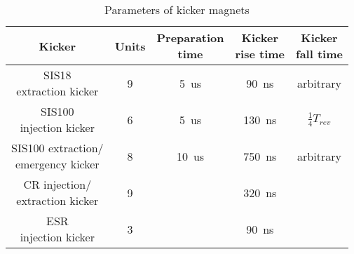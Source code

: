 
\label{kicker_time}

\begin{table}[!htb]

\caption{Parameters of kicker magnets}
\label{requirement}
\begin{center}
    \begin{tabular}{ | c | c | c | c| c |}
    \hline
\rowcolor[gray]{0.5}
Kicker 									&Units & \tabincell{c}{ Preparation\\time} & \tabincell{c}{Kicker \\rise time} & \tabincell{c}{ Kicker \\fall time} \\ \hline
\tabincell{c}{ SIS18 \\extraction kicker}				&	9	&	\SI{5}{us}	&	\SI{90}{ns} 		& arbitrary\\ \hline
\tabincell{c}{ SIS100 \\injection kicker}				&	6	&	\SI{5}{us} 	&	\SI{130}{ns} 	&	$\frac{1}{4}T_\mathit{rev}$	\\ \hline
\tabincell{c}{ SIS100 extraction/ \\emergency kicker}	&	8	&	\SI{10}{us}	&\SI{750}{ns} 		& arbitrary\\ \hline
\tabincell{c}{ CR injection/ \\extraction kicker}		&	9	&					&	\SI{320}{ns} 	&\\ \hline
\tabincell{c}{ ESR \\injection kicker}  					&	3	& 					&	\SI{90}{ns} 		&\\ \hline

    \end{tabular}
\end{center}
\end{table}

